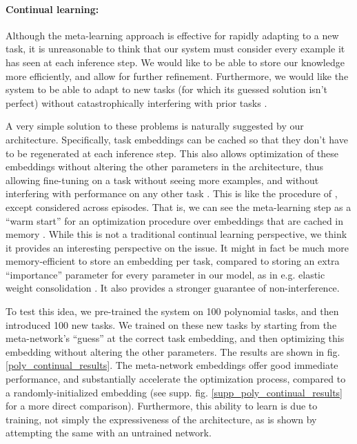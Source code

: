 \paragraph{Continual learning:} Although the meta-learning approach is effective for rapidly adapting to a new task, it is unreasonable to think that our system must consider every example it has seen at each inference step. We would like to be able to store our knowledge more efficiently, and allow for further refinement. Furthermore, we would like the system to be able to adapt to new tasks (for which its guessed solution isn't perfect) without catastrophically interfering with prior tasks \citep{McCloskey1989}. \par
A very simple solution to these problems is naturally suggested by our architecture. Specifically, task embeddings can be cached so that they don't have to be regenerated at each inference step. This also allows optimization of these embeddings without altering the other parameters in the architecture, thus allowing fine-tuning on a task without seeing more examples, and without interfering with performance on any other task \citep[cf.][]{Rumelhart1993, Lampinen2018a}. This is like the procedure of \citet{Rusu2019}, except considered across episodes. That is, we can see the meta-learning step as a ``warm start'' for an optimization procedure over embeddings that are cached in memory \citep[cf.][]{Kumaran2016}. While this is not a traditional continual learning perspective, we think it provides an interesting perspective on the issue. It might in fact be much more memory-efficient to store an embedding per task, compared to storing an extra ``importance'' parameter for every parameter in our model, as in e.g. elastic weight consolidation \citep{Kirkpatrick2016}. It also provides a stronger guarantee of non-interference. \par
To test this idea, we pre-trained the system on 100 polynomial tasks, and then introduced 100 new tasks. We trained on these new tasks by starting from the meta-network's ``guess'' at the correct task embedding, and then optimizing this embedding without altering the other parameters. The results are shown in fig. \ref{poly_continual_results}. The meta-network embeddings offer good immediate performance, and substantially accelerate the optimization process, compared to a randomly-initialized embedding (see supp. fig. \ref{supp_poly_continual_results} for a more direct comparison). Furthermore, this ability to learn is due to training, not simply the expressiveness of the architecture, as is shown by attempting the same with an untrained network. \par
\newpage
